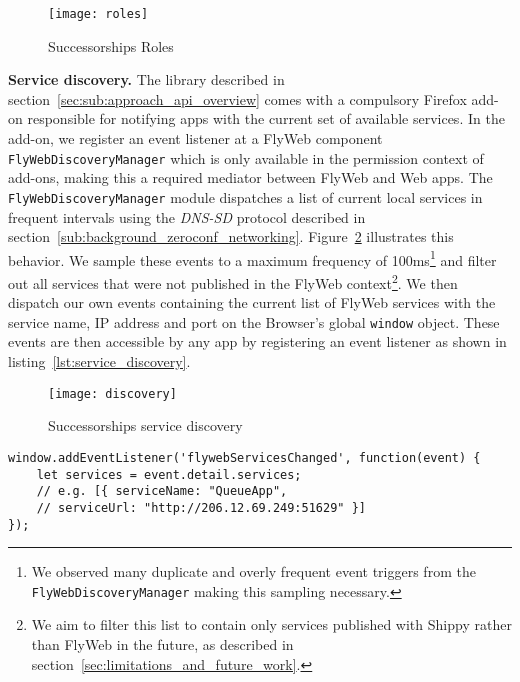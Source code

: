 \begin{figure}[h]
    \centering
    \texttt{[image: roles]}
    \caption{Successorships Roles}
    \label{fig:roles}
\end{figure}

\noindent\textbf{Service discovery.} 
The \APIshort library described in section~\ref{sec:sub:approach_api_overview} comes with a compulsory Firefox add-on responsible for notifying apps with the current set of available \APIshort services. 
In the add-on, we register an event listener at a FlyWeb component \texttt{FlyWebDiscoveryManager} which is only available in the permission context of add-ons, making this a required mediator between FlyWeb and \APIshort Web apps. 
The \texttt{FlyWebDiscoveryManager} module dispatches a list of current local services in frequent intervals using the \textit{DNS-SD} protocol described in section~\ref{sub:background_zeroconf_networking}. Figure~\ref{fig:discovery} illustrates this behavior.
We sample these events to a maximum frequency of 100ms\footnote{We observed many duplicate and overly frequent event triggers from the \texttt{FlyWebDiscoveryManager} making this sampling necessary.} and filter out all services that were not published in the FlyWeb context\footnote{We aim to filter this list to contain only services published with Shippy rather than FlyWeb in the future, as described in section~\ref{sec:limitations_and_future_work}.}. We then dispatch our own events containing the current list of FlyWeb services with the service name, IP address and port on the Browser's global \texttt{window} object. 
These events are then accessible by any \APIshort app by registering an event listener as shown in listing~\ref{lst:service_discovery}.

\begin{figure}[h]
    \centering
    \texttt{[image: discovery]}
    \caption{Successorships service discovery}
    \label{fig:discovery}
\end{figure}

\begin{lstlisting}[caption={Event listener for service discovery},label={lst:service_discovery}]
window.addEventListener('flywebServicesChanged', function(event) {
    let services = event.detail.services;
    // e.g. [{ serviceName: "QueueApp",
    // serviceUrl: "http://206.12.69.249:51629" }]
});
\end{lstlisting}


